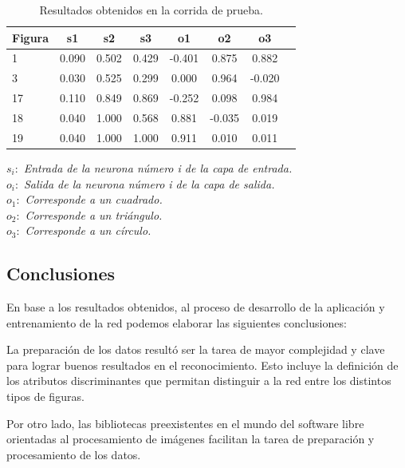 \documentclass[pdftex,a4paper,10.5pt]{article}
\begin{document}
\begin{table}[ht]
\centering
\begin{tabular}{|l|c|c|c|c|c|c|c|}
  \hline                       
  \textbf{Figura} & \textbf{s1} & \textbf{s2} & \textbf{s3} & \textbf{o1} & \textbf{o2} & \textbf{o3}\\
  \hline
1 & 0.090 & 0.502 & 0.429 & -0.401 & 0.875 & 0.882\\
\hline
3 & 0.030 & 0.525 & 0.299 & 0.000 & 0.964 & -0.020\\
\hline
17 & 0.110 & 0.849 & 0.869 & -0.252 & 0.098 & 0.984\\
\hline
18 & 0.040 & 1.000 & 0.568 & 0.881 & -0.035 & 0.019\\
\hline
19 & 0.040 & 1.000 & 1.000 & 0.911 & 0.010 & 0.011\\

\hline
\end{tabular}	 
\caption{Resultados obtenidos en la corrida de prueba.}
\end{table}

\begin{flushleft}
  $ s_{i}:  $	 \textit{ Entrada de la neurona n\'umero i de la capa de entrada.}\\
  $ o_{i}:  $	 \textit{ Salida de la neurona n\'umero i de la capa de salida. }\\
  $ o_{1}:  $	 \textit{ Corresponde a un cuadrado.}\\
  $ o_{2}:  $	 \textit{ Corresponde a un tri\'angulo.}\\
  $ o_{3}:  $	 \textit{ Corresponde a un c\'irculo.}\\
\end{flushleft}

	        

\newpage
\subsection{Conclusiones} %

	En base a los resultados obtenidos, al proceso de desarrollo de la aplicaci\'on y
	entrenamiento de la red podemos elaborar las siguientes conclusiones:
	
	La preparaci\'on de los datos result\'o ser la tarea de mayor complejidad y clave para
	lograr buenos resultados en el reconocimiento. Esto incluye la definici\'on de los atributos
	discriminantes que permitan distinguir a la red entre los distintos tipos de figuras.
	
	Por otro lado, las bibliotecas preexistentes en el mundo del software libre orientadas
	al procesamiento de im\'agenes facilitan la tarea de preparaci\'on y procesamiento 
	de los datos.
\end{document}
